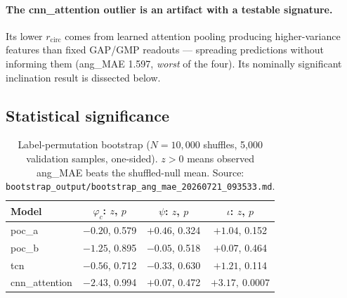 \documentclass[11pt]{article}
\begin{document}
\paragraph{The cnn\_attention outlier is an artifact with a testable signature.}
Its lower $r_{\mathrm{circ}}$ comes from learned attention pooling producing higher-variance features than fixed GAP/GMP readouts --- spreading predictions without informing them (ang\_MAE 1.597, \emph{worst} of the four).
Its nominally significant inclination result is dissected below.

\subsection{Statistical significance}
\label{sec:phicpsi:bootstrap}

\begin{table}[tbp]
    \centering
    \caption{Label-permutation bootstrap ($N = 10{,}000$ shuffles,
        5{,}000 validation samples, one-sided). $z > 0$ means observed
        ang\_MAE beats the shuffled-null mean.
        Source: \texttt{bootstrap\_output/bootstrap\_ang\_mae\_20260721\_093533.md}.}
    \label{tab:phicpsi:bootstrap}
    \small
    \begin{tabular}{@{}lccc@{}}
        \toprule
        Model          & $\varphi_c$: $z$, $p$ & $\psi$: $z$, $p$ & $\iota$: $z$, $p$         \\
        \midrule
        poc\_a         & $-0.20$, 0.579        & $+0.46$, 0.324   & $+1.04$, 0.152            \\
        poc\_b         & $-1.25$, 0.895        & $-0.05$, 0.518   & $+0.07$, 0.464            \\
        tcn            & $-0.56$, 0.712        & $-0.33$, 0.630   & $+1.21$, 0.114            \\
        cnn\_attention & $-2.43$, 0.994        & $+0.07$, 0.472   & $\mathbf{+3.17,\ 0.0007}$ \\
        \bottomrule
    \end{tabular}
\end{table}
\end{document}
